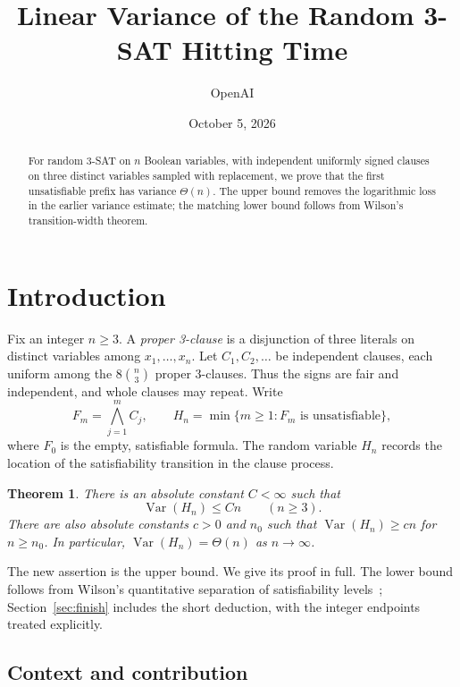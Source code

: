 \documentclass[11pt]{article}
\title{Linear Variance of the Random 3-SAT Hitting Time}
\author{OpenAI}
\date{October 5, 2026}
\newtheorem{theorem}{Theorem}[section]
\theoremstyle{remark}
\newcommand{\Var}{\operatorname{Var}}
\numberwithin{equation}{section}
\begin{document}
\maketitle

\begin{abstract}
For random 3-SAT on $n$ Boolean variables, with independent uniformly
signed clauses on three distinct variables sampled with replacement,
we prove that the first unsatisfiable prefix has variance $\Theta(n)$.
The upper bound removes the logarithmic loss in the earlier variance estimate;
the matching lower bound follows from Wilson's transition-width theorem.
\end{abstract}

\section{Introduction}
\label{sec:intro}

Fix an integer $n\ge3$. A \emph{proper 3-clause} is a disjunction of three
literals on distinct variables among $x_1,\ldots,x_n$. Let
$C_1,C_2,\ldots$ be independent clauses, each uniform among the
$8\binom n3$ proper 3-clauses. Thus the signs are fair and independent,
and whole clauses may repeat. Write
\[
 F_m=\bigwedge_{j=1}^m C_j,\qquad
 H_n=\min\{m\ge1:F_m\text{ is unsatisfiable}\},
\]
where $F_0$ is the empty, satisfiable formula. The random variable $H_n$
records the location of the satisfiability transition in the clause process.

\begin{theorem}
\label{thm:main}
There is an absolute constant $C<\infty$ such that
\[
 \Var(H_n)\le Cn\qquad(n\ge3).
\]
There are also absolute constants $c>0$ and $n_0$ such that
$\Var(H_n)\ge cn$ for $n\ge n_0$. In particular,
$\Var(H_n)=\Theta(n)$ as $n\to\infty$.
\end{theorem}

The new assertion is the upper bound. We give its proof in full.
The lower bound follows from Wilson's quantitative separation of
satisfiability levels~\cite[Corollary~4]{Wilson2002}; Section~\ref{sec:finish}
includes the short deduction, with the integer endpoints treated explicitly.

\subsection*{Context and contribution}
\end{document}
